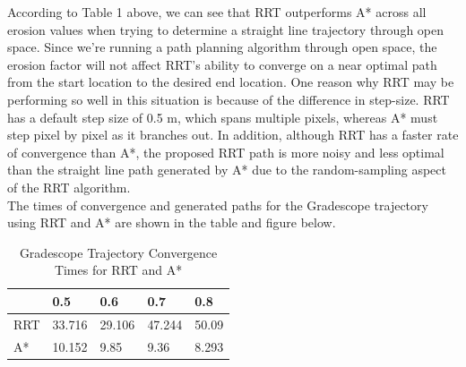 \documentclass{article}
\begin{document}
According to Table 1 above, we can see that RRT outperforms A* across all erosion values when trying to determine a straight line trajectory through open space. Since we're running a path planning algorithm through open space, the erosion factor will not affect RRT's ability to converge on a near optimal path from the start location to the desired end location. One reason why RRT may be performing so well in this situation is because of the difference in step-size. RRT has a default step size of 0.5 {m}, which spans multiple pixels, whereas A* must step pixel by pixel as it branches out. In addition, although RRT has a faster rate of convergence than A*, the proposed RRT path is more noisy and less optimal than the straight line path generated by A* due to the random-sampling aspect of the RRT algorithm. \\ The times of convergence and generated paths for the Gradescope trajectory using RRT and A* are shown in the table and figure below.

\begin{table}[ht]
    \centering
    \begin{tabular}{|l|l|l|l|l|}
        \hline
        & 0.5 & 0.6 & 0.7 & 0.8\\\hline
        RRT & 33.716 & 29.106 & 47.244 & 50.09 \\\hline
        A* & 10.152 & 9.85 & 9.36 & 8.293 \\ \hline
    \end{tabular}
    \caption{Gradescope Trajectory Convergence Times for RRT and A*\label{BACtable}}
\end{table}
\end{document}
